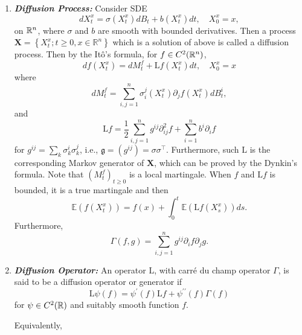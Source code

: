 \begin{enumerate}[label=\arabic{*}.]
	\item \textbf{\emph{Diffusion Process:}} Consider SDE
	\begin{equation*}
		d X_t^x=\sigma\left(X_t^x\right) d B_t+b\left(X_t^x\right) d t, \quad X_0^x=x,
	\end{equation*}
	on $\mathbb{R}^n$, where $\sigma$ and $b$ are smooth with bounded derivatives. Then a process $\mathbf{X}=\left\{X_t^x ; t \geq 0, x \in \mathbb{R}^n\right\}$ which is a solution of above is called a diffusion process. Then by the It\^o's formula, for $f \in C^2(\mathbb{R}^n)$,
	\begin{equation*}
		df(X^x_t) =d M_t^f+\mathrm{L} f\left(X_t^x\right) d t, \quad X_0^x=x
	\end{equation*}
	where
	\begin{equation*}
		dM_t^f = \sum_{i, j=1}^n \sigma_i^j\left(X_t^x\right) \partial_j f\left(X_t^x\right) d B_t^i,
	\end{equation*}
	and
	\begin{equation*}
		\mathrm{L} f=\frac{1}{2} \sum_{i, j=1}^n g^{ij} \partial_{i j}^2 f+\sum_{i=1}^n b^i \partial_i f
	\end{equation*}
	for $g^{ij} =\sum_k \sigma_k^i \sigma_k^j$, i.e., $\mathfrak{g}=(g^{ij}) = \sigma \sigma^\top$. Furthermore, such $\mathrm{L}$ is the corresponding Markov generator of $\mathbf{X}$, which can be proved by the Dynkin’s formula. Note that $(M_t^f)_{t \geq 0}$ is a local martingale. When $f$ and $\mathrm{L}f$ is bounded, it is a true martingale and then
	\begin{equation*}
		\mathbb{E}\left(f\left(X_t^x\right)\right)=f(x)+\int_0^t \mathbb{E}\left(\mathrm{L} f\left(X_s^x\right)\right) d s.
	\end{equation*}
	Furthermore, 
	\begin{equation*}
		\Gamma(f,g) = \sum_{i,j=1}^n g^{ij}\partial_i f\partial_jg.
	\end{equation*}

	\item \textbf{\emph{Diffusion Operator:}} An operator $\mathrm{L}$, with carr\'e du champ operator $\Gamma$, is said to be a diffusion operator or generator if
	\begin{equation*}
		\mathrm{L} \psi(f)=\psi^{\prime}(f) \mathrm{L} f+\psi^{\prime \prime}(f) \Gamma(f)
	\end{equation*}
	for $\psi \in C^2(\mathbb{R})$ and suitably smooth function $f$.

	Equivalently,


\end{enumerate}













	